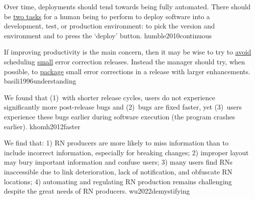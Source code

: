 \documentclass{article}
\begin{document}

  {Over time, deployments should tend towards being fully automated. There should be \ul{two tasks} for a human being to perform to deploy software into a development, test, or production environment: to pick the version and environment and to press the `deploy' button.}
  {humble2010continuous}


  {If improving productivity is the main concern, then it may be wise to try to \ul{avoid} scheduling \ul{small} error correction releases. Instead the manager should try, when possible, to \ul{package} small error corrections in a release with larger enhancements.
  }
  {basili1996understanding}

  {We found that (1)~with shorter release cycles, users do not experience significantly more post-release bugs and (2)~bugs are fixed faster, yet (3)~users experience these bugs earlier during software execution (the program crashes earlier).}
  {khomh2012faster}






  {We find that: 1) RN producers are more likely to miss information than to include incorrect information, especially for breaking changes; 2) improper layout may bury important information and confuse users; 3) many users find RNs inaccessible due to link deterioration, lack of notification, and obfuscate RN locations; 4) automating and regulating RN production remains challenging despite the great needs of RN producers.}
  {wu2022demystifying}
\end{document}
